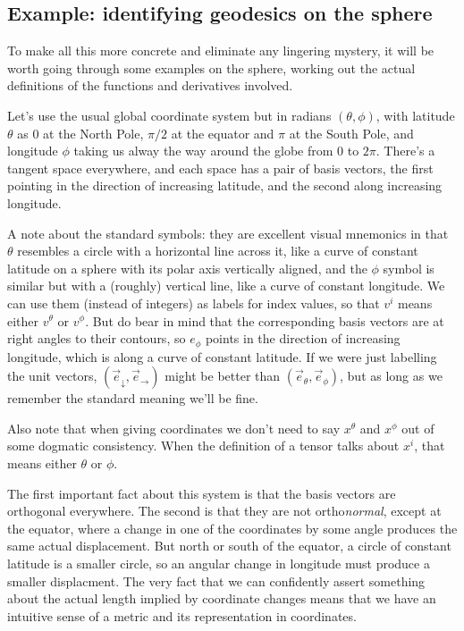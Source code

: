 \subsection{Example: identifying geodesics on the sphere}

To make all this more concrete and eliminate any lingering mystery, it will be worth going through some examples on the sphere, working out the actual definitions of the functions and derivatives involved.

Let's use the usual global coordinate system but in radians $(\theta, \phi)$, with latitude $\theta$ as $0$ at the North Pole, $\pi/2$ at the equator and $\pi$ at the South Pole, and longitude $\phi$ taking us alway the way around the globe from $0$ to $2\pi$. There's a tangent space everywhere, and each space has a pair of basis vectors, the first pointing in the direction of increasing latitude, and the second along increasing longitude.

A note about the standard symbols: they are excellent visual mnemonics in that $\theta$ resembles a circle with a horizontal line across it, like a curve of constant latitude on a sphere with its polar axis vertically aligned, and the $\phi$ symbol is similar but with a (roughly) vertical line, like a curve of constant longitude. We can use them (instead of integers) as labels for index values, so that $v^i$ means either $v^\theta$ or $v^\phi$. But do bear in mind that the corresponding basis vectors are at right angles to their contours, so $e_{\phi}$ points in the direction of increasing longitude, which is along a curve of constant latitude. If we were just labelling the unit vectors, $(\vec{e}_{\downarrow}, \vec{e}_{\rightarrow})$ might be better than $(\vec{e}_{\theta}, \vec{e}_{\phi})$, but as long as we remember the standard meaning we'll be fine.

Also note that when giving coordinates we don't need to say $x^{\theta}$ and $x^{\phi}$ out of some dogmatic consistency. When the definition of a tensor talks about $x^i$, that means either $\theta$ or $\phi$.

The first important fact about this system is that the basis vectors are orthogonal everywhere. The second is that they are not ortho\textit{normal}, except at the equator, where a change in one of the coordinates by some angle produces the same actual displacement. But north or south of the equator, a circle of constant latitude is a smaller circle, so an angular change in longitude must produce a smaller displacment. The very fact that we can confidently assert something about the actual length implied by coordinate changes means that we have an intuitive sense of a metric and its representation in coordinates.

